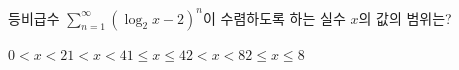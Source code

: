 등비급수 $\displaystyle\sum_{n=1}^{\infty} (\log_2 x-2)^n$이 수렴하도록 하는 실수 $x$의 값의 범위는?
\begin{choices32}{$0<x<2$}{$1<x<4$}{$1\le x\le 4$}{$2<x<8$}{$2\le x\le 8$}\end{choices32}
